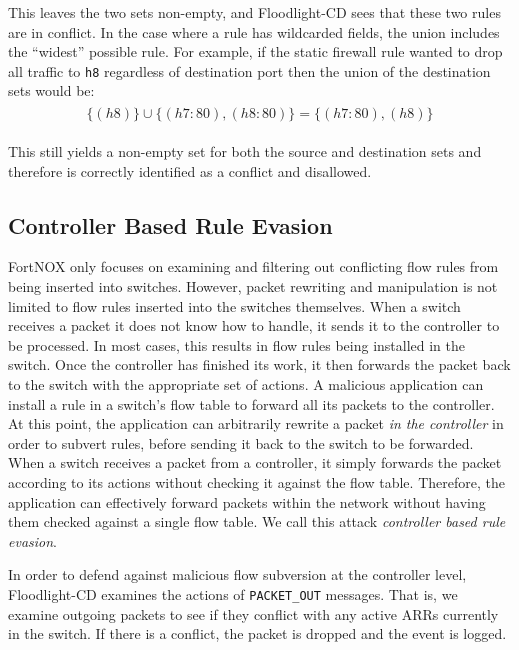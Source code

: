 This leaves the two sets non-empty, and Floodlight-CD sees that these two rules are in conflict.
In the case where a rule has wildcarded fields, the union includes the ``widest'' possible rule.
For example, if the static firewall rule wanted to drop all traffic to \texttt{h8} regardless of destination port then the union of the destination sets would be:
\begin{align}
\begin{aligned}
\{(h8)\} \cup \{(h7:80),(h8:80)\} =  \{(h7:80),(h8)\} \nonumber
\end{aligned}
\end{align}

This still yields a non-empty set for both the source and destination sets and therefore is correctly identified as a conflict and disallowed.

\subsection{Controller Based Rule Evasion}
\label{subsec:cbre}

FortNOX only focuses on examining and filtering out conflicting flow rules from being inserted into switches. 
However, packet rewriting and manipulation is not limited to flow rules inserted into the switches themselves. 
When a switch receives a packet it does not know how to handle, it sends it to the controller to be processed.
In most cases, this results in flow rules being installed in the switch.
Once the controller has finished its work, it then forwards the packet back to the switch with the appropriate set of actions.
A malicious application can install a rule in a switch's flow table to forward all its packets to the controller.
At this point, the application can arbitrarily rewrite a packet \emph{in the controller} in order to subvert rules, before sending it back to the switch to be forwarded. 
When a switch receives a packet from a controller, it simply forwards the packet according to its actions without checking it against the flow table.
Therefore, the application can effectively forward packets within the network without having them checked against a single flow table.
We call this attack \emph{controller based rule evasion}.

In order to defend against malicious flow subversion at the controller level, Floodlight-CD examines the actions of \texttt{PACKET\_OUT} messages. 
That is, we examine outgoing packets to see if they conflict with any active ARRs currently in the switch. 
If there is a conflict, the packet is dropped and the event is logged.


